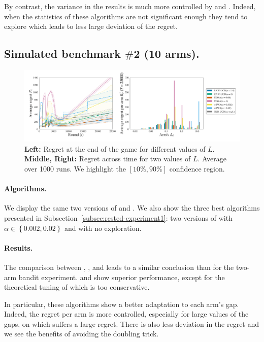 By contrast, the variance in the results is much more controlled by \RAWUCB and \FEWA. Indeed, when the statistics of these algorithms are not significant enough they tend to explore which leads to less large deviation of the regret. 

\subsection{Simulated benchmark $\#$2 (10 arms).}

\begin{figure}[t]
\centering
\includegraphics[width = 0.99 \textwidth]{3Rested/fig/fig2_main.pdf}
\caption{\textbf{Left:} Regret at the end of the game for different values of $L$. \textbf{Middle, Right:} Regret across time for two values of $L$. Average over 1000 runs. We highlight the $\left[10\%, 90\%\right]$ confidence region.}
\label{fig:rested-exp2}
\end{figure}

\paragraph{Algorithms.} We display the same two versions of \FEWA and \RAWUCB. We also show the three best algorithms presented in Subsection~\ref{subsec:rested-experiment1}: two versions of \wSWA with $\alpha\in \left\{0.002, 0.02\right\}$ and \GLRUCB with no exploration. 

\paragraph{Results.}
The comparison between \RAWUCB, \FEWA, and \wSWA leads to a similar conclusion than for the two-arm bandit experiment. \RAWUCB and \FEWA show superior performance, except for the theoretical tuning of \FEWA which is too conservative. 

In particular, these algorithms show a better adaptation to each arm's gap. Indeed, the regret per arm is more controlled, especially for large values of the gaps, on which \wSWA suffers a large regret. There is also less deviation in the regret and we see the benefits of avoiding the doubling trick. 

